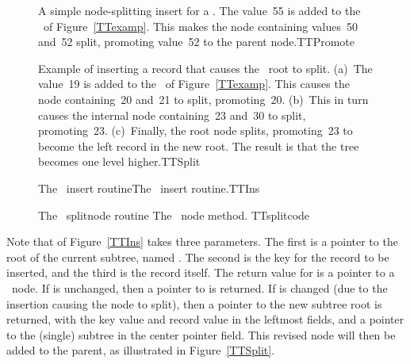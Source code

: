 \begin{figure}
\vspace{-\bigskipamount}

{A simple node-splitting insert for a \TTtree.
The value~55 is added to the \TTtree\ of Figure~\ref{TTexamp}.
This makes the node containing values~50 and~52 split, promoting
value~52 to the parent node.}{TTPromote}
\medskip
\end{figure}

\begin{figure}
\vspace{-\smallskipamount}

{Example of inserting a record that causes the \TTtree\ root to split.
(a)~The value~19 is added to the \TTtree\ of Figure~\ref{TTexamp}.
This causes the node containing~20 and~21 to split, promoting~20.
(b)~This in turn causes the internal node containing~23 and~30 to
split, promoting~23.
(c)~Finally, the root node splits, promoting~23
to become the left record in the new root.
The result is that the tree becomes one level higher.}{TTSplit}
\bigskip
\end{figure}

\begin{figure}
\vspace{-\bigskipamount}\vspace{-1pt}

\capt{4.5in}
{The \TTtree\ insert routine}{The \TTtree\ insert routine.}{TTIns}
\end{figure}

\begin{figure}
\vspace{-\medskipamount}\vspace{-1pt}

\capt{4.5in}
{The \TTtree\ splitnode routine}
{The \TTtree\ node  method.}
{TTsplitcode}
\end{figure}

Note that  of Figure~\ref{TTIns} takes
three parameters.
The first is a pointer to the root of the current subtree, named
.
The second is the key for the record to be
inserted, and the third is the record itself.
The return value for  is a pointer to a \TTtree\
node.
If  is unchanged, then a pointer to  is returned.
If \Cref{rt} is changed (due to the insertion causing the node to
split), then a pointer to the new subtree root is returned, with the
key value and record value in the leftmost fields, and a pointer to
the (single) subtree in the center pointer field.
This revised node will then be added to the parent, as illustrated in
Figure~\ref{TTSplit}.

